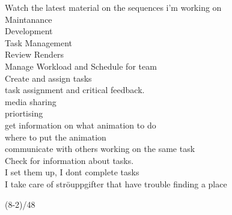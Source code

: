 \begin{adjustwidth}{0.3cm}{}
        Watch the latest material on the sequences i'm working on\\
        Maintanance\\
        Development\\
        Task Management\\
        Review Renders\\
        Manage Workload and Schedule for team\\
        Create and assign tasks\\
        task assignment and critical feedback.\\
        media sharing\\
        priortising\\
        get information on what animation to do\\
        where to put the animation\\
        communicate with others working on the same task\\
        Check for information about tasks.\\
        I set them up, I dont complete tasks\\
        I take care of ströuppgifter that have trouble finding a place \\
      \end{adjustwidth}
(8-2)/48
